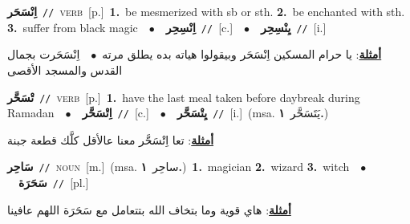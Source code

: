 \documentclass[10pt,a4paper,twoside]{article} %
\begin{document}
\begin{multicols}{2}
{\setlength\topsep{0pt}\textbf{\foreignlanguage{arabic}{اِنْسَحَر}}\ {\color{gray}\texttt{//}\color{black}}\ \textsc{verb}\ [p.]\ \textbf{1.}~be mesmerized with sb or sth.  \textbf{2.}~be enchanted with sth.  \textbf{3.}~suffer from black magic\ \ $\bullet$\ \ \setlength\topsep{0pt}\textbf{\foreignlanguage{arabic}{اِنْسِحِر}}\ {\color{gray}\texttt{//}\color{black}}\ [c.]\ \ $\bullet$\ \ \setlength\topsep{0pt}\textbf{\foreignlanguage{arabic}{يِنْسِحِر}}\ {\color{gray}\texttt{//}\color{black}}\ [i.]\  \begin{flushright}\color{gray}\foreignlanguage{arabic}{\textbf{\underline{\foreignlanguage{arabic}{أمثلة}}}: يا حرام المسكين اِنْسَحَر وبيقولوا هياته بده يطلق مرته\ $\bullet$\ \  اِنْسَحَرت بجمال  القدس والمسجد الأقصى}\end{flushright}\color{black}} \vspace{2mm}

{\setlength\topsep{0pt}\textbf{\foreignlanguage{arabic}{تْسَحَّر}}\ {\color{gray}\texttt{//}\color{black}}\ \textsc{verb}\ [p.]\ \textbf{1.}~have the last meal taken before daybreak during Ramadan\ \ $\bullet$\ \ \setlength\topsep{0pt}\textbf{\foreignlanguage{arabic}{اِتْسَحَّر}}\ {\color{gray}\texttt{//}\color{black}}\ [c.]\ \ $\bullet$\ \ \setlength\topsep{0pt}\textbf{\foreignlanguage{arabic}{يِتْسَحَّر}}\ {\color{gray}\texttt{//}\color{black}}\ [i.]\ \color{gray}(msa. \foreignlanguage{arabic}{يَتَسَحَّر}~\foreignlanguage{arabic}{\textbf{١.}})\color{black}\  \begin{flushright}\color{gray}\foreignlanguage{arabic}{\textbf{\underline{\foreignlanguage{arabic}{أمثلة}}}: تعا اِتْسَحَّر معنا عالأقل كلَّك قطعة جبنة}\end{flushright}\color{black}} \vspace{2mm}

{\setlength\topsep{0pt}\textbf{\foreignlanguage{arabic}{سَاحِر}}\ {\color{gray}\texttt{//}\color{black}}\ \textsc{noun}\ [m.]\ \color{gray}(msa. \foreignlanguage{arabic}{ساحِر}~\foreignlanguage{arabic}{\textbf{١.}})\color{black}\ \textbf{1.}~magician  \textbf{2.}~wizard  \textbf{3.}~witch\ \ $\bullet$\ \ \setlength\topsep{0pt}\textbf{\foreignlanguage{arabic}{سَحَرَة}}\ {\color{gray}\texttt{//}\color{black}}\ [pl.]\  \begin{flushright}\color{gray}\foreignlanguage{arabic}{\textbf{\underline{\foreignlanguage{arabic}{أمثلة}}}: هاي قوية وما بتخاف الله بتتعامل مع سَحَرَة اللهم عافينا}\end{flushright}\color{black}} \vspace{2mm}


\end{multicols}
\end{document}
